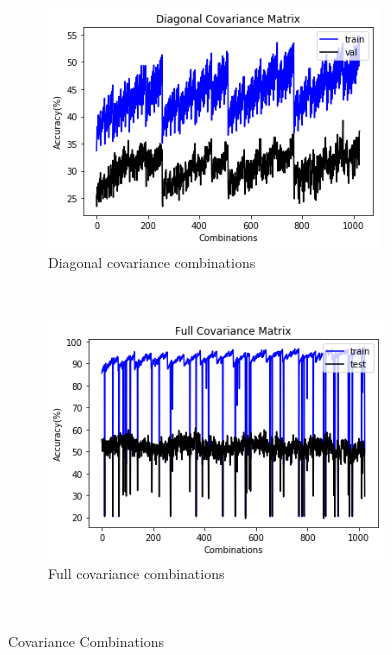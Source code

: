 \begin{figure}[!ht]
    \centering
    \begin{subfigure}[t]{0.5\textwidth}
        \centering
        \includegraphics[height=2.5in]{Dataset_2a/diagonal covariance graph combinations.png}
        \caption{Diagonal covariance combinations}
    \end{subfigure}%
    ~ 
    \begin{subfigure}[t]{0.5\textwidth}
        \centering
        \includegraphics[height=2.5in]{Dataset_2a/full covariance graph combinations.png}
        \caption{Full covariance combinations}
    \end{subfigure}%
    ~
    \caption{Covariance Combinations}
    \label{fig:27}
\end{figure}

